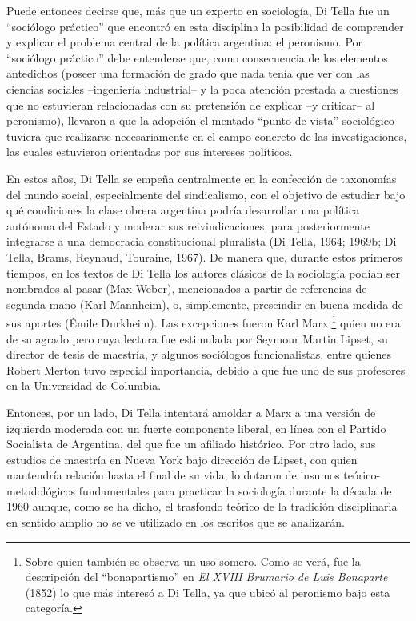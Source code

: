 Puede entonces decirse que, más que un experto en sociología, Di Tella fue un ``sociólogo práctico'' que encontró en esta disciplina la posibilidad de comprender y explicar el problema central de la política argentina: el peronismo. Por ``sociólogo práctico'' debe entenderse que, como consecuencia de los elementos antedichos (poseer una formación de grado que nada tenía que ver con las ciencias sociales --ingeniería industrial-- y la poca atención prestada a cuestiones que no estuvieran relacionadas con su pretensión de explicar --y criticar-- al peronismo), llevaron a que la adopción el mentado ``punto de vista'' sociológico tuviera que realizarse necesariamente en el campo concreto de las investigaciones, las cuales estuvieron orientadas por sus intereses políticos.

En estos años, Di Tella se empeña centralmente en la confección de taxonomías del mundo social, especialmente del sindicalismo, con el objetivo de estudiar bajo qué condiciones la clase obrera argentina podría desarrollar una política autónoma del Estado y moderar sus reivindicaciones, para posteriormente integrarse a una democracia constitucional pluralista (Di Tella, 1964; 1969b; Di Tella, Brams, Reynaud, Touraine, 1967). De manera que, durante estos primeros tiempos, en los textos de Di Tella los autores clásicos de la sociología podían ser nombrados al pasar (Max Weber), mencionados a partir de referencias de segunda mano (Karl Mannheim), o, simplemente, prescindir en buena medida de sus aportes (Émile Durkheim). Las excepciones fueron Karl Marx,\footnote{Sobre quien también se observa un uso somero. Como se verá, fue la descripción del ``bonapartismo'' en \emph{El XVIII Brumario de Luis Bonaparte} (1852) lo que más interesó a Di Tella, ya que ubicó al peronismo bajo esta categoría.} quien no era de su agrado pero cuya lectura fue estimulada por Seymour Martin Lipset, su director de tesis de maestría, y algunos sociólogos funcionalistas, entre quienes Robert Merton tuvo especial importancia, debido a que fue uno de sus profesores en la Universidad de Columbia.

Entonces, por un lado, Di Tella intentará amoldar a Marx a una versión de izquierda moderada con un fuerte componente liberal, en línea con el Partido Socialista de Argentina, del que fue un afiliado histórico. Por otro lado, sus estudios de maestría en Nueva York bajo dirección de Lipset, con quien mantendría relación hasta el final de su vida, lo dotaron de insumos teórico-metodológicos fundamentales para practicar la sociología durante la década de 1960 aunque, como se ha dicho, el trasfondo teórico de la tradición disciplinaria en sentido amplio no se ve utilizado en los escritos que se analizarán.

